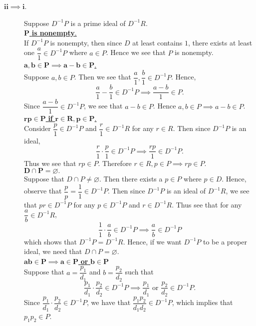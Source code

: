 \begin{prf}
\begin{description}
        \item[$\bm{ii \implies i}$.] 
        Suppose $D^{-1}P$ is a prime ideal of $D^{-1}R$. 
        \\[1.2ex]
        \underline{$\bm{P}$ \textbf{is nonempty}.}\\[1.2ex]
        If $D^{-1}P$ is nonempty, then since $D$ at least contains $1$, there exists at least one
        $\dfrac{a}{1} \in D^{-1}P$ where $a \in P$.
        Hence we see that $P$ is nonempty.
        \\[1.2ex]
        \underline{$\bm{a,b \in P \implies a - b \in P}$.}\\[1.2ex]
        Suppose $a, b \in P$. Then we see that 
        $\dfrac{a}{1}, \dfrac{b}{1} \in D^{-1}P$. Hence,
        \[
            \frac{a}{1} - \frac{b}{1} \in D^{-1}P \implies 
            \frac{a - b}{1} \in P.
        \]
        Since $\dfrac{a - b}{1} \in D^{-1}P$, we see that $a - b \in
        P$. Hence $a, b \in P \implies a - b \in P$.
        \\[1.2ex]
        \underline{$\bm{rp \in P}$ \textbf{if} $\bm{r \in R, p \in P}$.}\\[1.2ex]
        Consider $\dfrac{p}{1} \in D^{-1}P$ and $\dfrac{r}{1} \in
        D^{-1}R$ for any $r \in R$. Then since $D^{-1}P$ is an ideal,
        \[
            \frac{r}{1} \cdot \frac{p}{1} \in D^{-1}P \implies \frac{rp}{1} \in D^{-1}P.
        \]
        Thus we see that $rp \in P$. Therefore $r \in R, p \in P
        \implies rp \in P$. 
        \\[1.2ex]
        \underline{$\bm{D \cap P = \varnothing}.$}\\[1.2ex]
        Suppose that $D \cap P \ne \varnothing$. Then there exists a
        $p \in P$ where $p \in D$. Hence, observe that $\dfrac{p}{p} =
        \dfrac{1}{1} \in D^{-1}P$. Then since $D^{-1}P$ is an ideal of
        $D^{-1}R$, we see that
        $pr \in D^{-1}P$ for any $p \in D^{-1}P$ and $r \in D^{-1}R$. Thus
        see that for any $\dfrac{a}{b} \in D^{-1}R$, 
        \[
            \frac{1}{1} \cdot \frac{a}{b} \in D^{-1}P \implies \frac{a}{b} \in D^{-1}P
        \]
        which shows that $D^{-1}P = D^{-1}R$. Hence, if we want
        $D^{-1}P$ to be a proper ideal, we need that $D \cap P = \varnothing.$
        \\[1.2ex]
        \underline{$\bm{ab \in P \implies a \in P}$ \textbf{or} $\bm{b\in P}$}\\[1.2ex]
        Suppose that $a = \dfrac{p_1}{d_1}$ and $b =
        \dfrac{p_2}{d_2}$ such that 
        \[
            \frac{p_1}{d_1}\cdot \frac{p_2}{d_2} \in D^{-1}P \implies \frac{p_1}{d_1} \text{ or } \frac{p_2}{d_2} \in D^{-1}P.
        \]
        Since $\dfrac{p_1}{d_1}\cdot \dfrac{p_2}{d_2} \in D^{-1}P$, we
        have that $\dfrac{p_1p_2}{d_1d_2} \in D^{-1}P$, which implies
        that $p_1p_2 \in P$. 


\end{description}
\end{prf}
